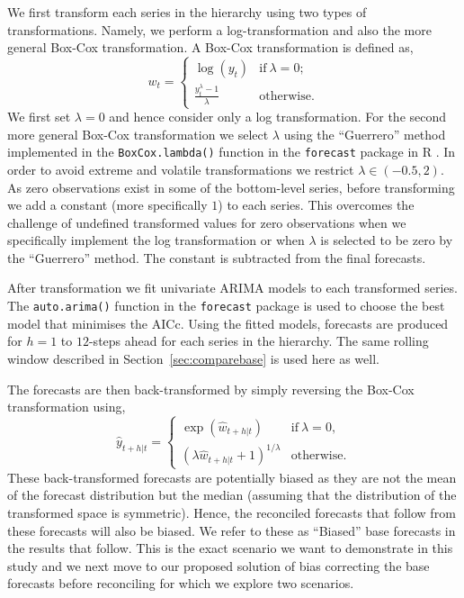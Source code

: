 \documentclass[12pt]{article}
\theoremstyle{definition}
\begin{document}
We first transform each series in the hierarchy using two types of transformations. Namely, we perform a log-transformation and also the more general Box-Cox transformation. A Box-Cox transformation is defined as,
\begin{equation*}\label{eq:BoxCox_transformation}
w_t = \begin{cases}
        \log(y_t)                        & \text{if}~\lambda=0;\\
        \frac{y_t^\lambda - 1}{\lambda}  & \text{otherwise}.
      \end{cases}
\end{equation*}
We first set $\lambda=0$ and hence consider only a log transformation. For the second more general Box-Cox transformation we select $\lambda$ using the ``Guerrero'' method \citep{guerrero1993time} implemented in the \verb|BoxCox.lambda()| function in the \verb|forecast| package in R \citep{Rforecast}. In order to avoid extreme and volatile transformations we restrict $\lambda \in (-0.5,2)$. As zero observations exist in some of the bottom-level series, before transforming we add a constant (more specifically $1$) to each series. This overcomes the challenge of undefined transformed values for zero observations when we specifically implement the log transformation or when $\lambda$ is selected to be zero by the ``Guerrero'' method. The constant is subtracted from the final forecasts.

After transformation we fit univariate ARIMA models to each transformed series. The \verb|auto.arima()| function in the \verb|forecast| package is used to choose the best model that minimises the AICc. Using the fitted models, forecasts are produced for $h=1$ to $12$-steps ahead for each series in the hierarchy. The same rolling window described in Section~\ref{sec:comparebase} is used here as well.

The forecasts are then back-transformed by simply reversing the Box-Cox transformation using,
\begin{equation}\label{eq:BoxCox_back-transformation}
  \hat{y}_{t+h|t} =
    \begin{cases}
      \exp({\hat{w}_{t+h|t}})                   & \text{if}~\lambda = 0, \\
      (\lambda \hat{w}_{t+h|t} + 1)^{1/\lambda} & \text{otherwise.}
  \end{cases}
\end{equation}
These back-transformed forecasts are potentially biased as they are not the mean of the forecast distribution but the median (assuming that the distribution of the transformed space is symmetric). Hence, the reconciled forecasts that follow from these forecasts will also be biased. We refer to these as ``Biased'' base forecasts in the results that follow. This is the exact scenario we want to demonstrate in this study and we next move to our proposed solution of bias correcting the base forecasts before reconciling for which we explore two scenarios.
\end{document}
